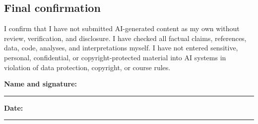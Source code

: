 \documentclass[11pt]{article}
\begin{document}
\bigskip

\subsection*{Final confirmation}

\noindent
I confirm that I have not submitted AI-generated content as my own without review,
verification, and disclosure. I have checked all factual claims, references, data,
code, analyses, and interpretations myself. I have not entered sensitive,
personal, confidential, or copyright-protected material into AI systems in
violation of data protection, copyright, or course rules.

\bigskip
\bigskip
\bigskip

\noindent
\textbf{Name and signature:} \rule{6cm}{0.4pt}
\hfill
\textbf{Date:} \rule{4cm}{0.4pt}
\end{document}
